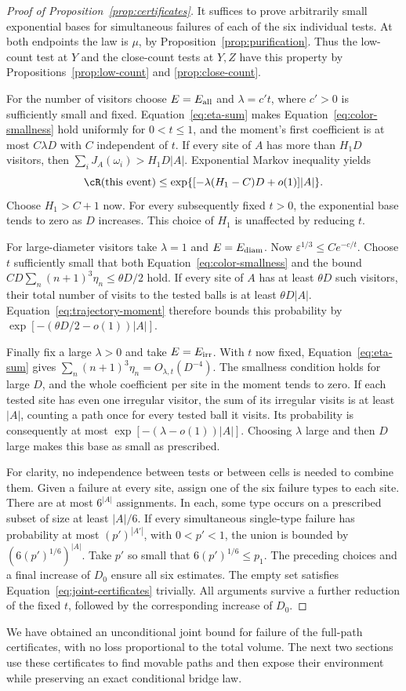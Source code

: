\begin{proof}[Proof of Proposition~\ref{prop:certificates}]
It suffices to prove arbitrarily small exponential
bases for simultaneous failures of each of the six
individual tests.  At both endpoints the law is
$\mu$, by Proposition~\ref{prop:purification}.
Thus the low-count test at $Y$ and the close-count
tests at $Y,Z$ have this property by
Propositions~\ref{prop:low-count} and \ref{prop:close-count}.

For the number of visitors choose $E=E_{\rm all}$
and $\lambda=c't$, where $c'>0$ is sufficiently
small and fixed.  Equation~\eqref{eq:eta-sum}
makes Equation~\eqref{eq:color-smallness} hold
uniformly for $0<t\le1$, and the moment's first
coefficient is at most $C\lambda D$ with $C$
independent of $t$.  If every site of $A$ has more
than $H_1D$ visitors, then
$\sum_i J_A(\omega_i)>H_1D|A|$.  Exponential
Markov inequality yields
\[
 \cR(\text{this event})
 \le\exp\{[-\lambda(H_1-C)D+o(1)]|A|\}.
\]
Choose $H_1>C+1$ now.  For every subsequently
fixed $t>0$, the exponential base tends to zero
as $D$ increases.  This choice of $H_1$ is
unaffected by reducing $t$.

For large-diameter visitors take $\lambda=1$ and
$E=E_{\rm diam}$.  Now
$\varepsilon^{1/3}\le Ce^{-c/t}$.
Choose $t$ sufficiently small that both
Equation~\eqref{eq:color-smallness} and the bound
$CD\sum_n(n+1)^3\eta_n\le\theta D/2$ hold.
If every site of $A$ has at least $\theta D$
such visitors, their total number of visits to
the tested balls is at least $\theta D|A|$.
Equation~\eqref{eq:trajectory-moment} therefore
bounds this probability by
$\exp[-(\theta D/2-o(1))|A|]$.

Finally fix a large $\lambda>0$ and take
$E=E_{\rm irr}$.  With $t$ now fixed,
Equation~\eqref{eq:eta-sum} gives
$\sum_n(n+1)^3\eta_n=O_{\lambda,t}(D^{-4})$.
The smallness condition holds for large $D$,
and the whole coefficient per site in the
moment tends to zero.  If each tested site has
even one irregular visitor, the sum of its
irregular visits is at least $|A|$, counting
a path once for every tested ball it visits.
Its probability is consequently at most
$\exp[-(\lambda-o(1))|A|]$.
Choosing $\lambda$ large and then $D$ large
makes this base as small as prescribed.

For clarity, no independence between tests or
between cells is needed to combine them.
Given a failure at every site, assign one of
the six failure types to each site.  There
are at most $6^{|A|}$ assignments.  In each,
some type occurs on a prescribed subset of
size at least $|A|/6$.  If every simultaneous
single-type failure has probability at most
$(p')^{|A'|}$, with $0<p'<1$, the union is
bounded by $(6(p')^{1/6})^{|A|}$.
Take $p'$ so small that $6(p')^{1/6}\le p_1$.
The preceding choices and a final increase
of $D_0$ ensure all six estimates.  The empty
set satisfies Equation~\eqref{eq:joint-certificates}
trivially.  All arguments survive a further
reduction of the fixed $t$, followed by the
corresponding increase of $D_0$.
\end{proof}

We have obtained an unconditional joint bound for
failure of the full-path certificates, with no loss
proportional to the total volume.  The next two
sections use these certificates to find movable
paths and then expose their environment while
preserving an exact conditional bridge law.

